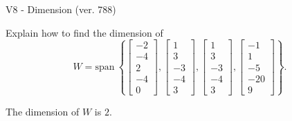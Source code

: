\begin{exercise}
  \begin{exerciseTitle}V8 - Dimension (ver. 788)\end{exerciseTitle}
  \begin{exerciseStatement}
    Explain how to find the dimension of 
\[W=\mathrm{span}\ \left\{\left[\begin{array}{r}
-2 \\
-4 \\
2 \\
-4 \\
0
\end{array}\right] , \left[\begin{array}{r}
1 \\
3 \\
-3 \\
-4 \\
3
\end{array}\right] , \left[\begin{array}{r}
1 \\
3 \\
-3 \\
-4 \\
3
\end{array}\right] , \left[\begin{array}{r}
-1 \\
1 \\
-5 \\
-20 \\
9
\end{array}\right]\right\}.\]



  \end{exerciseStatement}
  \begin{exerciseAnswer}
   The dimension of \(W\) is  \(2\).
  


  \end{exerciseAnswer}
\end{exercise}